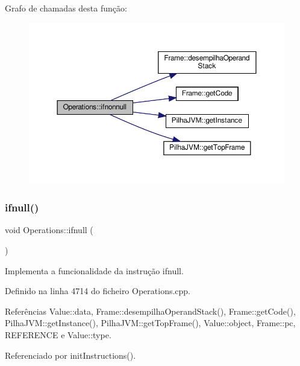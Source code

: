 Grafo de chamadas desta função\+:\nopagebreak
\begin{figure}[H]
\begin{center}
\leavevmode
\includegraphics[width=350pt]{classOperations_a00af7ab198690f5d3e6c7f2b2d374194_cgraph}
\end{center}
\end{figure}
\mbox{\label{classOperations_a030f5995f8f357254e543d0cbce2d189}} 
\subsubsection{\texorpdfstring{ifnull()}{ifnull()}}
{\footnotesize\ttfamily void Operations\+::ifnull (\begin{DoxyParamCaption}{ }\end{DoxyParamCaption})\hspace{0.3cm}{\ttfamily [private]}}



Implementa a funcionalidade da instrução ifnull. 



Definido na linha 4714 do ficheiro Operations.\+cpp.



Referências Value\+::data, Frame\+::desempilha\+Operand\+Stack(), Frame\+::get\+Code(), Pilha\+J\+V\+M\+::get\+Instance(), Pilha\+J\+V\+M\+::get\+Top\+Frame(), Value\+::object, Frame\+::pc, R\+E\+F\+E\+R\+E\+N\+CE e Value\+::type.



Referenciado por init\+Instructions().

